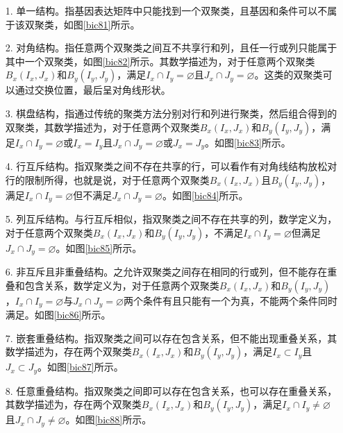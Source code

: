   \begin{enumerate}
    \item[1.] 单一结构。指基因表达矩阵中只能找到一个双聚类，且基因和条件可以不属于该双聚类，如图\ref{bic81}所示。

    \item[2.] 对角结构。指任意两个双聚类之间互不共享行和列，且任一行或列只能属于其中一个双聚类，如图\ref{bic82}所示。其数学描述为，对于任意两个双聚类$B_x(I_x, J_x)$和$B_y(I_y, J_y)$，满足$I_x \cap I_y = \varnothing $且$J_x \cap J_y = \varnothing $。这类的双聚类可以通过交换位置，最后呈对角线形状。
    
    \item[3.] 棋盘结构，指通过传统的聚类方法分别对行和列进行聚类，然后组合得到的双聚类，其数学描述为，对于任意两个双聚类$B_x(I_x, J_x)$和$B_y(I_y, J_y)$，满足$I_x \cap I_y = \varnothing $或$I_x = I_y $且$J_x \cap J_y = \varnothing $或$J_x = J_y $。如图\ref{bic83}所示。
    
    \item[4.] 行互斥结构。指双聚类之间不存在共享的行，可以看作有对角线结构放松对行的限制所得，也就是说，对于任意两个双聚类$B_x(I_x, J_x)$且$B_y(I_y, J_y)$，满足$I_x \cap I_y = \varnothing $但不满足$J_x \cap J_y = \varnothing $。如图\ref{bic84}所示。
    
    \item[5.] 列互斥结构。与行互斥相似，指双聚类之间不存在共享的列，数学定义为，对于任意两个双聚类$B_x(I_x, J_x)$和$B_y(I_y, J_y)$，不满足$I_x \cap I_y = \varnothing $但满足$J_x \cap J_y = \varnothing $。如图\ref{bic85}所示。
    
    \item[6.] 非互斥且非重叠结构。之允许双聚类之间存在相同的行或列，但不能存在重叠和包含关系，数学定义为，对于任意两个双聚类$B_x(I_x, J_x)$和$B_y(I_y, J_y)$，$I_x \cap I_y = \varnothing $与$J_x \cap J_y = \varnothing $两个条件有且只能有一个为真，不能两个条件同时满足。如图\ref{bic86}所示。
    
    \item[7.] 嵌套重叠结构。指双聚类之间可以存在包含关系，但不能出现重叠关系，其数学描述为，存在两个双聚类$B_x(I_x, J_x)$和$B_y(I_y, J_y)$，满足$I_x \subset I_y $且$J_x \subset J_y $。如图\ref{bic87}所示。
    
    \item[8.] 任意重叠结构。指双聚类之间即可以存在包含关系，也可以存在重叠关系，其数学描述为，存在两个双聚类$B_x(I_x, J_x)$和$B_y(I_y, J_y)$，满足$I_x \cap I_y \ne \varnothing $且$J_x \cap J_y \ne \varnothing $。如图\ref{bic88}所示。
  \end{enumerate}

